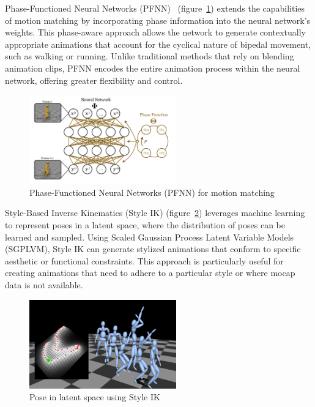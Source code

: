\documentclass[../../main.tex]{subfiles}
\begin{document}
Phase-Functioned Neural Networks (PFNN)~\cite{10.1145/3072959.3073663} (figure~\ref{fig:pfnn})  extends the capabilities of motion matching by incorporating phase information into the neural network's weights. This phase-aware approach allows the network to generate contextually appropriate animations that account for the cyclical nature of bipedal movement, such as walking or running. Unlike traditional methods that rely on blending animation clips, PFNN encodes the entire animation process within the neural network, offering greater flexibility and control.

\begin{figure}
  \centering \includegraphics[width = 2.5in]{chapters/motion_matching/images/pfnn.png}
  \caption{Phase-Functioned Neural Networks (PFNN) for motion matching}
  \label{fig:pfnn}
\end{figure}

Style-Based Inverse Kinematics (Style IK) (figure~\ref{fig:style_ik}) leverages machine learning to represent poses in a latent space, where the distribution of poses can be learned and sampled. Using Scaled Gaussian Process Latent Variable Models (SGPLVM), Style IK can generate stylized animations that conform to specific aesthetic or functional constraints. This approach is particularly useful for creating animations that need to adhere to a particular style or where mocap data is not available\cite{grochow2004style}.

\begin{figure}
  \centering \includegraphics[width = 2.5in]{chapters/motion_matching/images/style_ik.png}
  \caption{Pose in latent space using Style IK}
  \label{fig:style_ik}
\end{figure}
\end{document}
